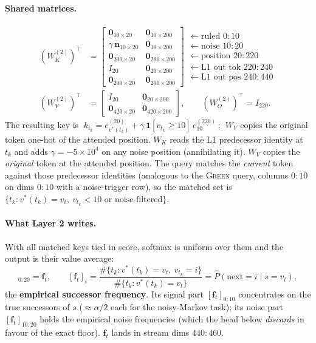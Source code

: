 \documentclass[11pt]{article}
\newcommand{\ev}[2]{e^{(#1)}_{#2}}        %
\newcommand{\T}{^{\!\top}}
\newcommand{\vstar}{v^{*}}
\newcommand{\fvec}{\mathbf{f}}
\newcommand{\one}{\mathbf{1}}
\newcommand{\zeros}{\mathbf{0}}
\begin{document}
\paragraph{Shared matrices.}
\begin{align}
(W^{(2)}_K)\T &=
\begin{bmatrix}\zeros_{10\times20}&\zeros_{10\times200}\\ \gamma\,\mathbf{n}_{10\times20}&\zeros_{10\times200}\\
\zeros_{200\times20}&\zeros_{200\times200}\\ I_{20}&\zeros_{20\times200}\\ \zeros_{200\times20}&\zeros_{200\times200}\end{bmatrix}
\begin{array}{l}\scriptstyle\leftarrow\text{ruled }0{:}10\\\scriptstyle\leftarrow\text{noise }10{:}20\\\scriptstyle\leftarrow\text{position }20{:}220\\\scriptstyle\leftarrow\text{L1 out tok }220{:}240\\\scriptstyle\leftarrow\text{L1 out pos }240{:}440\end{array}
\\[4pt]
(W^{(2)}_V)\T &= \begin{bmatrix}I_{20}&\zeros_{20\times200}\\ \zeros_{420\times20}&\zeros_{420\times200}\end{bmatrix},
\qquad (W^{(2)}_O)\T = I_{220}.
\end{align}
The resulting key is $\;k_{t_k}=\ev{20}{\vstar(t_k)}+\gamma\,\one[v_{t_k}\!\ge\!10]\,\ev{220}{10}$\,;
$\;W_V$ copies the original token one-hot of the attended position.
$W_K$ reads the L1 predecessor identity at $t_k$ and adds $\gamma=-5\times10^4$ on any noise
position (annihilating it). $W_V$ copies the \emph{original} token at the attended position. The query
matches the \emph{current} token against those predecessor identities (analogous to the
\textsc{Green} query, columns $0{:}10$ on dims $0{:}10$ with a noise-trigger row), so the matched
set is $\{t_k:\vstar(t_k)=v_t,\ v_{t_k}\!<\!10\text{ or noise-filtered}\}$.

\paragraph{What Layer 2 writes.} With all matched keys tied in score, softmax is uniform over them
and the output is their value average:
\begin{equation}
[a^{(2)}_t]_{0:20}=\fvec_t,\qquad
[\fvec_t]_i=\frac{\#\{t_k:\vstar(t_k)=v_t,\ v_{t_k}=i\}}{\#\{t_k:\vstar(t_k)=v_t\}}
=\widehat{P}(\text{next}=i\mid s=v_t),
\end{equation}
the \textbf{empirical successor frequency}. Its signal part $[\fvec_t]_{0:10}$ concentrates on the
true successors of $s$ ($\approx\alpha/2$ each for the noisy-Markov task); its noise part
$[\fvec_t]_{10:20}$ holds the empirical noise frequencies (which the head below \emph{discards} in
favour of the exact floor). $\fvec_t$ lands in stream dims $440{:}460$.
\end{document}
